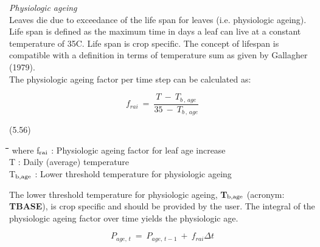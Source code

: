 \documentclass[11pt]{article}
\begin{document}
\bigskip
\bigskip
{\it Physiologic ageing\/}\\
Leaves die due to exceedance of the life span for leaves (i.e. physiologic ageing). Life
span is defined as the maximum time in days a leaf can live at a constant temper\-ature of
35\degrees C. Life span is crop specific. The concept of lifespan is compatible with a definition
in terms of temperature sum as given by Gallagher (1979).\\
The physiologic ageing factor per time step can be calculat\-ed as:

\begin{displaymath}
f _{rai} ~=~{\frac{ T~-~T _{b\, ,\, age} }{35~-~ T _{b\, ,\, age} }}
\end{displaymath}

 \bigskip
\strut\hfill (5.56)

\nwln
\begin{tabbing}
\hspace{1.27cm}\=\hspace{1.27cm}\=\hspace{1.27cm}\=\hspace{1.27cm}\=%
\hspace{1.27cm}\=\hspace{1.27cm}\=\hspace{1.27cm}\=\hspace{1.27cm}\=%
\hspace{1.27cm}\=\hspace{1.27cm}\=\kill
where\> f$_{{\rm rai}}$\> : Physiologic ageing factor for leaf age increase\> \> \> \> \> \> \> \> [-]\\
\>T\> : Daily (average) temperature\> \> \> \> \> \> \> \> [\degrees C]\\
\>T$_{{\rm b,age}}$\> : Lower threshold temperature for physiologic ageing\> \> \> \> \> \> \> \> [\degrees C]
\end{tabbing}

\bigskip
\bigskip
\bigskip
\bigskip
\bigskip
\bigskip
The lower threshold temperature for physiologic ageing, {\bf T$_{{\rm b,age}}$} (acronym: {\bf TBASE}), is
crop specific and should be provided by the user. The integral of the physiologic ageing
factor over time yields the physiologic age. 

\begin{displaymath}
P _{age,\, t} ~=~ P _{age,\, t-1} ~+~f _{rai} \Delta t
\end{displaymath}
\end{document}
